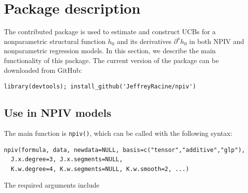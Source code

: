 \documentclass[
]{jss}
\begin{document}
\hypertarget{desc}{%
\section{Package description}\label{desc}}

The contributed  package  is used to estimate and
construct UCBs for a nonparametric structural function \(h_0\) and its
derivatives \(\partial^a h_0\) in both NPIV and nonparametric regression
models. In this section, we describe the main functionality of this
package. The current version of the package can be downloaded from
GitHub:

\begin{verbatim}
library(devtools); install_github('JeffreyRacine/npiv')
\end{verbatim}

\hypertarget{use-in-npiv-models}{%
\subsection{Use in NPIV models}\label{use-in-npiv-models}}

The main function is \texttt{npiv()}, which can be called with the
following syntax:

\begin{verbatim}
npiv(formula, data, newdata=NULL, basis=c("tensor","additive","glp"),
  J.x.degree=3, J.x.segments=NULL, 
  K.w.degree=4, K.w.segments=NULL, K.w.smooth=2, ...)
\end{verbatim}

The required arguments include
\end{document}
